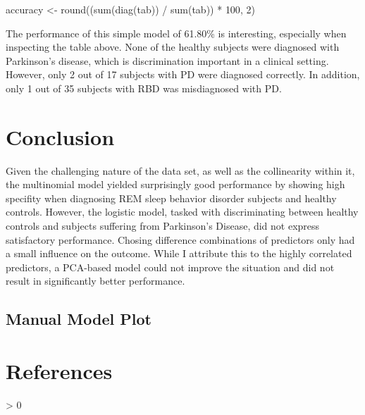 \documentclass[
  english,
  doc,floatsintext]{apa6}
\newenvironment{Shaded}{\begin{snugshade}}{\end{snugshade}}
\newcommand{\DecValTok}[1]{\textcolor[rgb]{0.00,0.00,0.81}{#1}}
\newcommand{\FunctionTok}[1]{\textcolor[rgb]{0.00,0.00,0.00}{#1}}
\newcommand{\NormalTok}[1]{#1}
\newcommand{\OtherTok}[1]{\textcolor[rgb]{0.56,0.35,0.01}{#1}}
\newcommand{\SpecialCharTok}[1]{\textcolor[rgb]{0.00,0.00,0.00}{#1}}
\newlength{\cslhangindent}
\newenvironment{CSLReferences}[2] %
 {%
  \setlength{\parindent}{0pt}
  \ifodd #1 \everypar{\setlength{\hangindent}{\cslhangindent}}\ignorespaces\fi
  \ifnum #2 > 0
  \setlength{\parskip}{#2\baselineskip}
  \fi
 }%
 {}
\begin{document}
\begin{Shaded}
\begin{Highlighting}[]
\NormalTok{accuracy }\OtherTok{\textless{}{-}} \FunctionTok{round}\NormalTok{((}\FunctionTok{sum}\NormalTok{(}\FunctionTok{diag}\NormalTok{(tab)) }\SpecialCharTok{/} \FunctionTok{sum}\NormalTok{(tab)) }\SpecialCharTok{*} \DecValTok{100}\NormalTok{, }\DecValTok{2}\NormalTok{)}
\end{Highlighting}
\end{Shaded}

The performance of this simple model of 61.80\% is interesting, especially when inspecting the
table above. None of the healthy subjects were diagnosed with Parkinson's disease, which is discrimination
important in a clinical setting. However, only 2 out of 17 subjects with PD were diagnosed correctly. In
addition, only 1 out of 35 subjects with RBD was misdiagnosed with PD.

\clearpage

\hypertarget{conclusion}{%
\section{Conclusion}\label{conclusion}}

Given the challenging nature of the data set, as well as the collinearity within it, the multinomial model
yielded surprisingly good performance by showing high specifity when diagnosing REM sleep behavior disorder
subjects and healthy controls. However, the logistic model, tasked with discriminating between
healthy controls and subjects suffering from Parkinson's Disease, did not express satisfactory performance. Chosing
difference combinations of predictors only had a small influence on the outcome. While I attribute this to
the highly correlated predictors, a PCA-based model could not improve the situation and did not result in
significantly better performance.

\clearpage

\hypertarget{manual-model-plot}{%
\subsection{Manual Model Plot}\label{manual-model-plot}}

\clearpage

\hypertarget{references}{%
\section{References}\label{references}}

\begingroup
\setlength{\parindent}{-0.5in}
\setlength{\leftskip}{0.5in}

\hypertarget{refs}{}
\begin{CSLReferences}{0}{0}
\end{CSLReferences}

\endgroup
\end{document}
